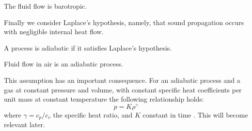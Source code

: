 \begin{assumption}\label{assumption:barotropic}
  The fluid flow is barotropic.
\end{assumption}
%
Finally we consider Laplace's hypothesis, namely, that sound propagation occurs with negligible internal heat flow.
\begin{defn}\label{defn:adiabatic}
    A process is adiabatic if it satisfies Laplace's hypothesis.
\end{defn} \par
\begin{assumption}\label{assumption:adiabatic}
  Fluid flow in air is an adiabatic process.
\end{assumption}
%
This assumption has an important consequence. For an adiabatic process and a gas at constant pressure and volume, with constant specific heat coefficients per unit mass at constant temperature the following relationship holds:
\begin{equation}\label{eq:adiabatic_condition}
    p = K \rho ^ \gamma
\end{equation}
where $\gamma = c_p/c_v$ the specific heat ratio, and $K$ constant in time \parencite[$\S$1.4.1]{pierce19acoustics}. This will become relevant later.
%
